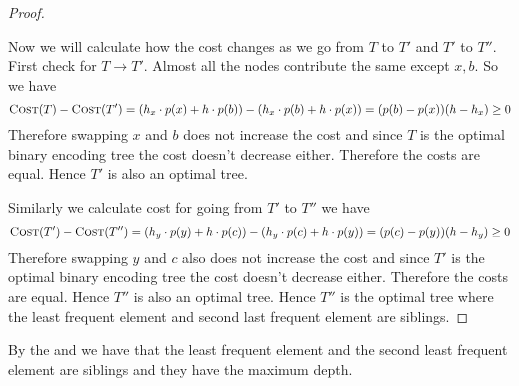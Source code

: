 \begin{proof}
\begin{center}
\label{fig:least-frequent-elm-siblings}
\end{center}

Now we will calculate how the cost changes as we go from $T$ to $T'$ and $T'$ to $T''$. First check for $T\to T'$. Almost all the nodes contribute the same except $x,b$. So we have $$\textsc{Cost}(T)-\textsc{Cost}(T')=(h_x\cdot p(x)+h\cdot p(b))-(h_x\cdot p(b)+h\cdot p(x))=(p(b)-p(x))(h-h_x)\geq 0$$Therefore swapping $x$ and $b$ does not increase the cost and since $T$ is the optimal binary encoding tree the cost doesn't decrease either. Therefore the costs are equal. Hence $T'$ is also an optimal tree. 

Similarly we calculate cost for going from $T'$ to $T''$ we have $$\textsc{Cost}(T')-\textsc{Cost}(T'')=(h_y\cdot p(y)+h\cdot p(c))-(h_y\cdot p(c)+h\cdot p(y))=(p(c)-p(y))(h-h_y)\geq 0$$Therefore swapping $y$ and $c$ also does not increase the cost and since $T'$ is the optimal binary encoding tree the cost doesn't decrease either. Therefore the costs are equal. Hence $T''$ is also an optimal tree. Hence $T''$ is the optimal tree where the least frequent element and second last frequent element are siblings.
\end{proof}




By the  and  we have that the least frequent element and the second least frequent element are siblings and they have the maximum depth.

